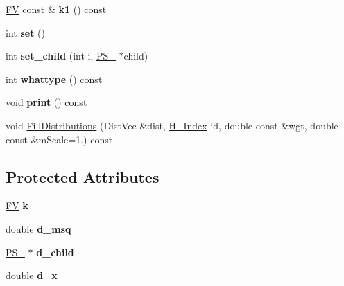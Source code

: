 \begin{DoxyCompactItemize}
\item 
\hypertarget{classPS__2__1_a8896fae62d323bceb002628a95466f3f}{}\hyperlink{classFV}{F\+V} const \& {\bfseries k1} () const \label{classPS__2__1_a8896fae62d323bceb002628a95466f3f}

\item 
\hypertarget{classPS__2__1_a02e613ae4acac6c2ea9c57a49a8e3f68}{}int {\bfseries set} ()\label{classPS__2__1_a02e613ae4acac6c2ea9c57a49a8e3f68}

\item 
\hypertarget{classPS__2__1_a3bcae5991298ad9a2fc143d4461c60fa}{}int {\bfseries set\+\_\+child} (int i, \hyperlink{classPS__2}{P\+S\+\_} $\ast$child)\label{classPS__2__1_a3bcae5991298ad9a2fc143d4461c60fa}

\item 
\hypertarget{classPS__2__1_aaa0d8ed0b5e2673cb5f2cd84f090e1f9}{}int {\bfseries whattype} () const \label{classPS__2__1_aaa0d8ed0b5e2673cb5f2cd84f090e1f9}

\item 
\hypertarget{classPS__2__1_a21760964ae4b35c2cfeff16b4c569c3a}{}void {\bfseries print} () const \label{classPS__2__1_a21760964ae4b35c2cfeff16b4c569c3a}

\item 
void \hyperlink{classPS__2__1_ab2cce6e614a771f856a1a541d22f3308}{Fill\+Distributions} (Dist\+Vec \&dist, \hyperlink{HistArray_8h_abdf25c9f0ab78c4243f63cb2bacf26d9}{H\+\_\+\+Index} id, double const \&wgt, double const \&m\+Scale=1.) const 
\end{DoxyCompactItemize}
\subsection*{Protected Attributes}
\begin{DoxyCompactItemize}
\item 
\hypertarget{classPS__2__1_a3606766aee8e4775462c15adda3acbc5}{}\hyperlink{classFV}{F\+V} {\bfseries k}\label{classPS__2__1_a3606766aee8e4775462c15adda3acbc5}

\item 
\hypertarget{classPS__2__1_a415b225aedab250a67aee39ef0d859bc}{}double {\bfseries d\+\_\+msq}\label{classPS__2__1_a415b225aedab250a67aee39ef0d859bc}

\item 
\hypertarget{classPS__2__1_a015027e1fc8e30949ea8a439cfedddd4}{}\hyperlink{classPS__2}{P\+S\+\_} $\ast$ {\bfseries d\+\_\+child}\label{classPS__2__1_a015027e1fc8e30949ea8a439cfedddd4}

\item 
\hypertarget{classPS__2__1_af18aa8f6679b7ac65be236b00e794e0c}{}double {\bfseries d\+\_\+x}\label{classPS__2__1_af18aa8f6679b7ac65be236b00e794e0c}

\end{DoxyCompactItemize}
